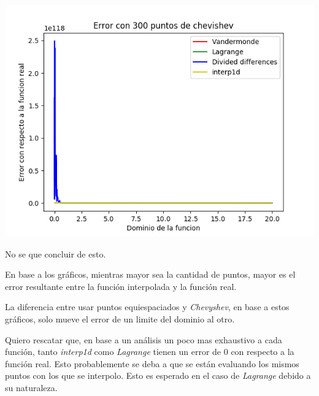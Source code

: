 \documentclass[spanish, fleqn]{article}
\begin{document}
\begin{enumerate}
\includegraphics[scale=1.0]{Figure_6.png}
\end{enumerate}

No se que concluir de esto.

En base a los gráficos, mientras mayor sea la cantidad de puntos, mayor es el error resultante entre la función interpolada y la función real.

La diferencia entre usar puntos equiespaciados y \textit{Chevyshev}, en base a estos gráficos, solo mueve el error de un limite del dominio al otro.

Quiero rescatar que, en base a un análisis un poco mas exhaustivo a cada función, tanto \textit{interp1d} como \textit{Lagrange} tienen un error de 0 con respecto a la función real. Esto probablemente se deba a que se están evaluando los mismos puntos con los que se interpolo. Esto es esperado en el caso de \textit{Lagrange} debido a su naturaleza.
\end{document}
